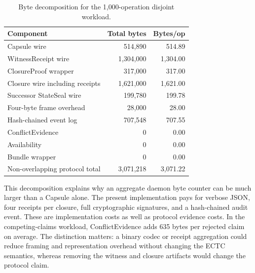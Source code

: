 \documentclass{ledger}
\begin{document}
\begin{table}[h]
\centering
\small
\caption{Byte decomposition for the 1,000-operation disjoint workload.}
\label{tab:overhead}
\begin{tabularx}{\textwidth}{p{4.0cm}r r}
\toprule
Component & Total bytes & Bytes/op \\
\midrule
Capsule wire & 514,890 & 514.89 \\
WitnessReceipt wire & 1,304,000 & 1,304.00 \\
ClosureProof wrapper & 317,000 & 317.00 \\
Closure wire including receipts & 1,621,000 & 1,621.00 \\
Successor StateSeal wire & 199,780 & 199.78 \\
Four-byte frame overhead & 28,000 & 28.00 \\
Hash-chained event log & 707,548 & 707.55 \\
ConflictEvidence & 0 & 0.00 \\
Availability & 0 & 0.00 \\
Bundle wrapper & 0 & 0.00 \\
Non-overlapping protocol total & 3,071,218 & 3,071.22 \\
\bottomrule
\end{tabularx}
\end{table}

This decomposition explains why an aggregate daemon byte counter can be much larger than a Capsule alone. The present implementation pays for verbose JSON, four receipts per closure, full cryptographic signatures, and a hash-chained audit event. These are implementation costs as well as protocol evidence costs. In the competing-claims workload, ConflictEvidence adds 635 bytes per rejected claim on average. The distinction matters: a binary codec or receipt aggregation could reduce framing and representation overhead without changing the ECTC semantics, whereas removing the witness and closure artifacts would change the protocol claim.
\end{document}
